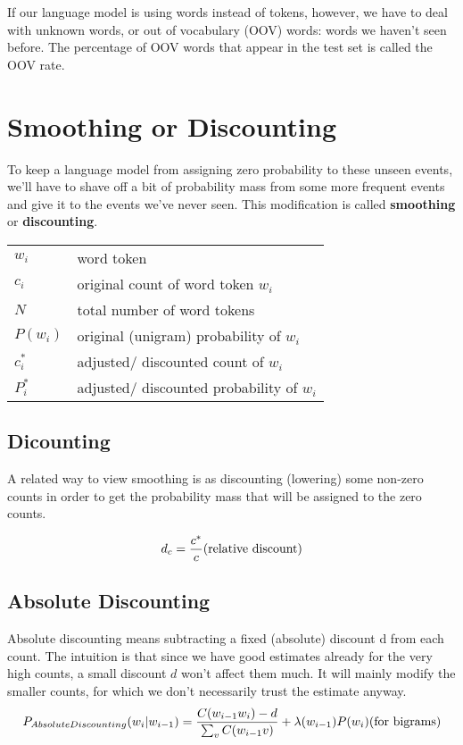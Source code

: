 If our language model is using words instead of tokens, however, we have to deal with unknown words, or out of vocabulary (OOV) words: words we haven’t seen before. The percentage of OOV words that appear in the test set is called the OOV rate.


\section{Smoothing or Discounting \cite{nlp-1}}

To keep a language model from assigning zero probability to these unseen events, we’ll have to shave off a bit of probability mass from some more frequent events and give it to the events we’ve never seen. This modification is called \textbf{smoothing} or \textbf{discounting}.

\begin{customTableWrapper}{1.3}
\begin{table}[H]
    \begin{tabular}{l l}
        $w_i$ & word token \\
        $c_i$ & original count of word token $w_i$ \\
        $N$ & total number of word tokens \\
        $P(w_i)$ & original (unigram) probability of $w_i$ \\
        $c_i^*$ & adjusted/ discounted count of $w_i$ \\
        $P_i^*$ & adjusted/ discounted probability of $w_i$ \\
    \end{tabular}
\end{table}
\end{customTableWrapper}


\subsection{Dicounting \cite{nlp-1}}
A related way to view smoothing is as discounting (lowering) some non-zero counts in order to get the probability mass that will be assigned to the zero counts.


\[
    d_c = \dfrac{c^*}{c}  \hfill \text{(relative discount)}
\]

\subsection{Absolute Discounting}
Absolute discounting means subtracting a fixed (absolute) discount d from each count. The intuition is that since we have good estimates already for the very high counts, a small discount $d$ won’t affect them much. It will mainly modify the smaller counts, for which we don’t necessarily trust the estimate anyway. 
\[
    P_{AbsoluteDiscounting}(w_i|w_{i-1}) = \dfrac{C(w_{i-1}w_i)-d}{\sum_v C(w_{i-1} v)} + \lambda (w_{i-1})P(w_i) \hfill \text{(for bigrams)}
\]

